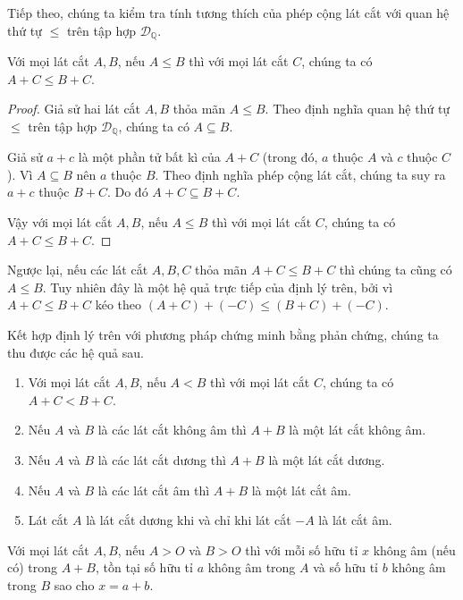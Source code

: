 Tiếp theo, chúng ta kiểm tra tính tương thích của phép cộng lát cắt với quan hệ thứ tự $\leq$ trên tập hợp $\mathscr{D}_{\mathbb{Q}}$.

\begin{theorem}
    Với mọi lát cắt $A, B$, nếu $A\leq B$ thì với mọi lát cắt $C$, chúng ta có $A + C\leq B + C$.
\end{theorem}

\begin{proof}
    Giả sử hai lát cắt $A, B$ thỏa mãn $A\leq B$. Theo định nghĩa quan hệ thứ tự $\leq$ trên tập hợp $\mathscr{D}_{\mathbb{Q}}$, chúng ta có $A\subseteq B$.

    Giả sử $a + c$ là một phần tử bất kì của $A + C$ (trong đó, $a$ thuộc $A$ và $c$ thuộc $C$). Vì $A\subseteq B$ nên $a$ thuộc $B$. Theo định nghĩa phép cộng lát cắt, chúng ta suy ra $a + c$ thuộc $B + C$. Do đó $A + C \subseteq B + C$.

    Vậy với mọi lát cắt $A, B$, nếu $A\leq B$ thì với mọi lát cắt $C$, chúng ta có $A + C\leq B + C$.
\end{proof}

Ngược lại, nếu các lát cắt $A, B, C$ thỏa mãn $A + C\leq B + C$ thì chúng ta cũng có $A\leq B$. Tuy nhiên đây là một hệ quả trực tiếp của định lý trên, bởi vì $A + C\leq B + C$ kéo theo $(A + C) + (-C) \leq (B + C) + (-C)$.

Kết hợp định lý trên với phương pháp chứng minh bằng phản chứng, chúng ta thu được các hệ quả sau.

\begin{corollary}
    \begin{enumerate}[label={(\roman*)}]
        \item Với mọi lát cắt $A, B$, nếu $A < B$ thì với mọi lát cắt $C$, chúng ta có $A + C < B + C$.
        \item Nếu $A$ và $B$ là các lát cắt không âm thì $A + B$ là một lát cắt không âm.
        \item Nếu $A$ và $B$ là các lát cắt dương thì $A + B$ là một lát cắt dương.
        \item Nếu $A$ và $B$ là các lát cắt âm thì $A + B$ là một lát cắt âm.
        \item Lát cắt $A$ là lát cắt dương khi và chỉ khi lát cắt $-A$ là lát cắt âm.
    \end{enumerate}
\end{corollary}

\begin{proposition}\label{proposition:nonnegative-elements-of-dedekind-cuts-addition}
    Với mọi lát cắt $A, B$, nếu $A > O$ và $B > O$ thì với mỗi số hữu tỉ $x$ không âm (nếu có) trong $A + B$, tồn tại số hữu tỉ $a$ không âm trong $A$ và số hữu tỉ $b$ không âm trong $B$ sao cho $x = a + b$.
\end{proposition}

